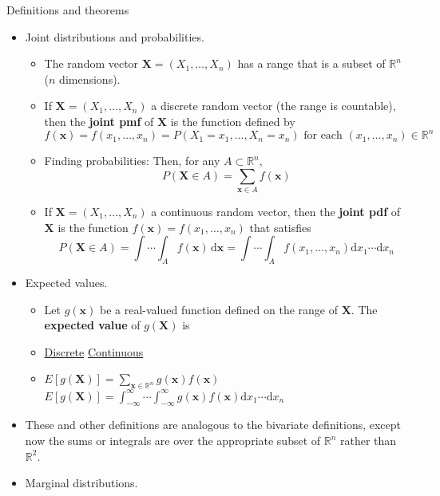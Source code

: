 \documentclass{article}
\newcommand{\vecn}[2]{#1_1, \ldots, #1_{#2}}	%
\newcommand{\integral}[4]{\displaystyle \int_{#1}^{#2} #3 \,\mathrm{d} #4}		%
\begin{document}
Definitions and theorems\bigskip
\begin{itemize}
    \item Joint distributions and probabilities.
    \begin{itemize}
        \item The random vector $\mathbf{X} = (\vecn{X}{n})$ has a range that is a subset of $\mathbb{R}^n$ ($n$ dimensions).
        \item If $\mathbf{X} = (\vecn{X}{n})$ a discrete random vector (the range is countable), then the \textbf{joint pmf} of $\mathbf{X}$ is the function defined by
        \[f(\mathbf{x}) = f(\vecn{x}{n}) = P(X_1 = x_1, \ldots, X_n = x_n) \text{ for each } (\vecn{x}{n}) \in \mathbb{R}^n\]
        \item Finding probabilities: Then, for any $A \subset \mathbb{R}^n$,
        \[P(\mathbf{X} \in A) = \sum_{\mathbf{x} \in A} f(\mathbf{x})\]
        \item If $\mathbf{X} = (\vecn{X}{n})$ a continuous random vector, then the \textbf{joint pdf} of $\mathbf{X}$ is the function $f(\mathbf{x}) = f(\vecn{x}{n})$ that satisfies
        \[P(\mathbf{X} \in A) = \int \cdots \integral{A}{}{f(\mathbf{x})}{\mathbf{x}} = \int \cdots \int_A f(\vecn{x}{n}) \mathrm{d}x_1\cdots \mathrm{d}x_n\]
    \end{itemize}\newpage
    \item Expected values.
    \begin{itemize}
        \item Let $g(\mathbf{x})$ be a real-valued function defined on the range of $\mathbf{X}$. The \textbf{expected value} of $g(\mathbf{X})$ is
        \item[] \ul{Discrete} \hspace{100pt} \ul{Continuous}
        \item[] $\displaystyle E[g(\mathbf{X})] = \sum_{\mathbf{x} \in \mathbb{R}^n} g(\mathbf{x}) f(\mathbf{x}) $ \hspace{30pt} $\displaystyle E[g(\mathbf{X})] = \int_{-\infty}^\infty \cdots \int_{-\infty}^\infty g(\mathbf{x}) f(\mathbf{x})\mathrm{d}x_1\cdots \mathrm{d}x_n$
        \end{itemize}
    \item These and other definitions are analogous to the bivariate definitions, except now the sums or integrals are over the appropriate subset of $\mathbb{R}^n$ rather than $\mathbb{R}^2$.
    \item Marginal distributions.
    \begin{itemize}

\end{itemize}
\end{itemize}
\end{document}

